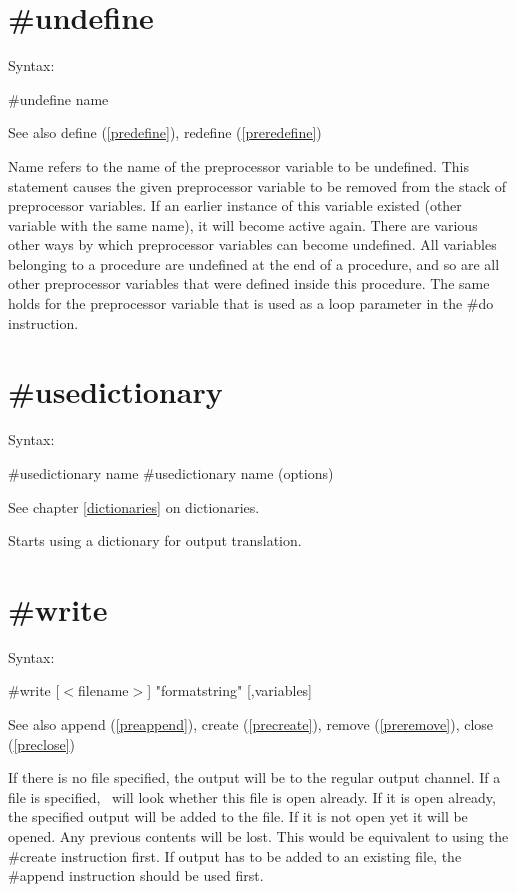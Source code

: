 \section{\#undefine}
\label{preundefine}

\noindent Syntax:

\#undefine name
 
\noindent See also define (\ref{predefine}), redefine 
(\ref{preredefine})

\noindent {} Name refers to the name of the 
preprocessor variable to be undefined. This 
statement causes the given preprocessor variable to be removed from the 
stack of preprocessor variables. If an earlier instance of this variable 
existed (other variable with the same name), it will become active again. 
There are various other ways by which preprocessor variables can become 
undefined. All variables belonging to a procedure are undefined at the end 
of a procedure, and so are all other preprocessor variables that were 
defined inside this procedure. The same holds for the preprocessor variable 
that is used as a loop parameter in the \#do instruction.

 
\section{\#usedictionary}
\label{preusedictionary}

\noindent Syntax:

\#usedictionary name
\#usedictionary name (options)
 
\noindent See chapter \ref{dictionaries} on dictionaries.

\noindent Starts using a dictionary for output translation.


\section{\#write}
\label{prewrite}

\noindent Syntax:

\#write [$<$filename$>$] "formatstring" [,variables]
 
\noindent See also append (\ref{preappend}),
            create (\ref{precreate}), remove (\ref{preremove}),
            close (\ref{preclose})

\noindent If there is no file specified, the output will be 
to the regular output channel. If a file is 
specified, \FORM\ will look whether this file is open already. If it is open 
already, the specified output will be added to the file. If it is not open 
yet it will be opened. Any previous contents will be lost. This would be 
equivalent to using the \#create instruction first. If 
output has to be added to an existing file, the \#append 
instruction should be used first.

